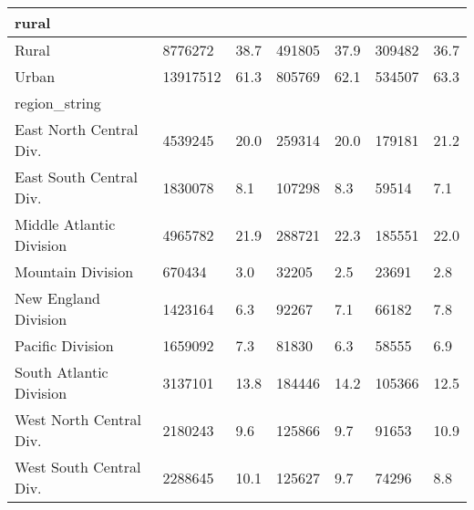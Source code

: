 \begin{longtable}{lllllll}
\midrule
\multicolumn{1}{l}{rural} \\ 
\midrule
Rural & 8776272 & 38.7 & 491805 & 37.9 & 309482 & 36.7 \\ 
Urban & 13917512 & 61.3 & 805769 & 62.1 & 534507 & 63.3 \\ 
\midrule
\multicolumn{1}{l}{region\_string} \\ 
\midrule
East North Central Div. & 4539245 & 20.0 & 259314 & 20.0 & 179181 & 21.2 \\ 
East South Central Div. & 1830078 & 8.1 & 107298 & 8.3 & 59514 & 7.1 \\ 
Middle Atlantic Division & 4965782 & 21.9 & 288721 & 22.3 & 185551 & 22.0 \\ 
Mountain Division & 670434 & 3.0 & 32205 & 2.5 & 23691 & 2.8 \\ 
New England Division & 1423164 & 6.3 & 92267 & 7.1 & 66182 & 7.8 \\ 
Pacific Division & 1659092 & 7.3 & 81830 & 6.3 & 58555 & 6.9 \\ 
South Atlantic Division & 3137101 & 13.8 & 184446 & 14.2 & 105366 & 12.5 \\ 
West North Central Div. & 2180243 & 9.6 & 125866 & 9.7 & 91653 & 10.9 \\ 
West South Central Div. & 2288645 & 10.1 & 125627 & 9.7 & 74296 & 8.8 \\ 
\bottomrule
\end{longtable}

